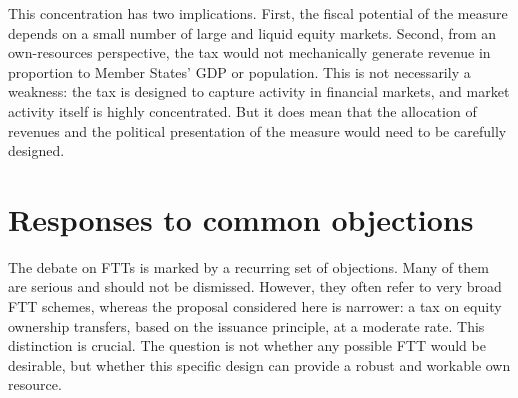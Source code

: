 \documentclass[../../main]{subfiles}
\begin{document}
This concentration has two implications. First, the fiscal potential of the measure depends on a small number of large and liquid equity markets. Second, from an own-resources perspective, the tax would not mechanically generate revenue in proportion to Member States' GDP or population. This is not necessarily a weakness: the tax is designed to capture activity in financial markets, and market activity itself is highly concentrated. But it does mean that the allocation of revenues and the political presentation of the measure would need to be carefully designed.


\section{Responses to common objections}

The debate on FTTs is marked by a recurring set of objections. Many of them are serious and should not be dismissed. However, they often refer to very broad FTT schemes, whereas the proposal considered here is narrower: a tax on equity ownership transfers, based on the issuance principle, at a moderate rate. This distinction is crucial. The question is not whether any possible FTT would be desirable, but whether this specific design can provide a robust and workable own resource.
\end{document}

